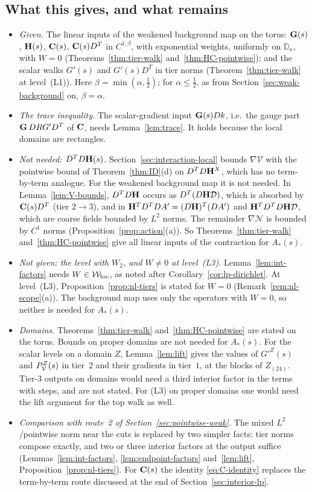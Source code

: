 \subsection{What this gives, and what remains}\label{ss:44.6}

\begin{itemize}
\item \emph{Given.} The linear inputs of the weakened background map on the torus: $\mathbf G(s)$, $\mathbf H(s)$, $\mathbf C(s)$, $\mathbf C(s)D^T$ in $C^{1,\beta}$, with exponential weights, uniformly on $\mathbb D_\kappa$, with $W=0$ (Theorems~\ref{thm:tier-walk} and~\ref{thm:HC-pointwise}); and the scalar walks $G'(s)$ and $G'(s)D^T$ in tier norms (Theorem~\ref{thm:tier-walk} at level~(L1)). Here $\beta=\min(\alpha,\frac12)$; for $\alpha\le\frac12$, as from Section~\ref{sec:weak-background} on, $\beta=\alpha$.
\item \emph{The trace inequality.} The scalar-gradient input $\mathbf G(s)Dk$, i.e.\ the gauge part $\mathbf G\,DRG'D^T$ of $\mathbf C$, needs Lemma~\ref{lem:trace}. It holds because the local domains are rectangles.
\item \emph{Not needed: $D^TD\mathbf H(s)$.} Section~\ref{sec:interaction-local} bounds $\nabla\mathcal V$ with the pointwise bound of Theorem~\ref{thm:ID}(d) on $D^TD\mathbf H^X$, which has no term-by-term analogue. For the weakened background map it is not needed. In Lemma~\ref{lem:V-bounds}, $D^TD\mathbf H$ occurs as $D^T(D\mathbf H\mathcal D)$, which is absorbed by $\mathbf C(s)D^T$ (tier $2\to3$), and in $\mathbf H^TD^TDA'=(D\mathbf H)^T(DA')$ and $\mathbf H^TD^TD\mathbf H\mathcal D$, which are coarse fields bounded by $L^2$ norms. The remainder $\nabla\mathcal N$ is bounded by $C^1$ norms (Proposition~\ref{prop:action}(a)). So Theorems~\ref{thm:tier-walk} and~\ref{thm:HC-pointwise} give all linear inputs of the contraction for $A_*(s)$.
\item \emph{Not given: the level with $W_2$, and $W\ne0$ at level~(L3).} Lemma~\ref{lem:int-factors} needs $W\in\mathcal W_{\rm loc}$, as noted after Corollary~\ref{cor:lp-dirichlet}. At level~(L3), Proposition~\ref{prop:nl-tiers} is stated for $W=0$ (Remark~\ref{rem:nl-scope}(a)). The background map uses only the operators with $W=0$, so neither is needed for $A_*(s)$.
\item \emph{Domains.} Theorems~\ref{thm:tier-walk} and~\ref{thm:HC-pointwise} are stated on the torus. Bounds on proper domains are not needed for $A_*(s)$. For the scalar levels on a domain $Z$, Lemma~\ref{lem:lift} gives the values of $G'^Z(s)$ and $P^Z_\mathcal V(s)$ in tier~$2$ and their gradients in tier~$1$, at the blocks of $Z_{(24)}$. Tier-$3$ outputs on domains would need a third interior factor in the terms with steps, and are not stated. For (L3) on proper domains one would need the lift argument for the top walk as well.
\item \emph{Comparison with route~2 of Section~\ref{sec:pointwise-weak}.} The mixed $L^2$/pointwise norm near the cuts is replaced by two simpler facts: tier norms compose exactly, and two or three interior factors at the output suffice (Lemmas~\ref{lem:int-factors}, \ref{lem:endpoint-factors} and~\ref{lem:lift}, Proposition~\ref{prop:nl-tiers}). For $\mathbf C(s)$ the identity \eqref{eq:C-identity} replaces the term-by-term route discussed at the end of Section~\ref{sec:interior-lp}.
\end{itemize}
